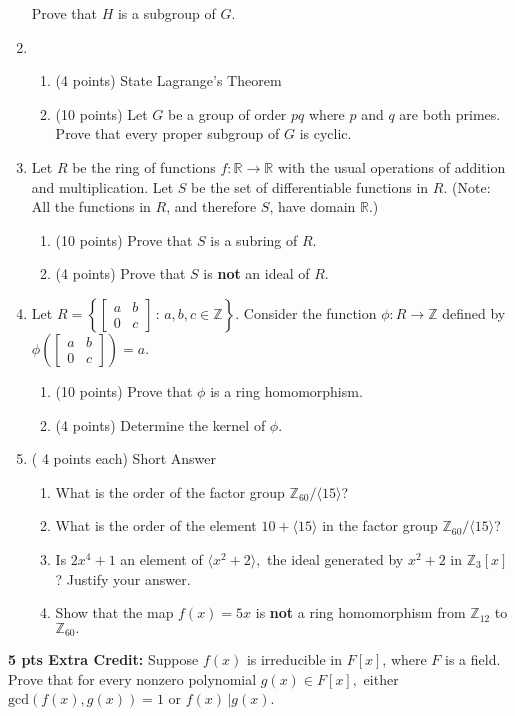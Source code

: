 \documentclass[12pt]{article}
\renewcommand{\emph}[1]{\textsf{\textbf{#1}}}
\newcommand{\bbZ}{\mathbb{Z}}
\newcommand{\bbR}{\mathbb{R}}
\begin{document}
\begin{enumerate}
Prove that $H$ is a subgroup of $G.$\\
\newpage
\item 
	\begin{enumerate}
	\item ({\small 4 points}) State Lagrange's Theorem
	\vspace{2in}
	\item  ({\small 10 points}) Let $G$ be a group of order $pq$ where $p$ and $q$ are both primes. Prove that every proper subgroup of $G$ is cyclic.
	\vfill
	\end{enumerate}
\newpage
\item Let $R$ be the ring of functions $f: \bbR \to \bbR$ with the usual operations of addition and multiplication. Let $S$ be the set of differentiable functions in $R.$ (Note: All the functions in $R$, and therefore $S$, have domain $\bbR.$)
	\begin{enumerate}
	\item ({\small 10 points}) Prove that $S$ is a subring of $R.$
	\vfill
	\item ({\small 4 points}) Prove that $S$ is \emph{not} an ideal of $R.$
	\vfill
	\end{enumerate}
\newpage
\item Let $R=\left\{\begin{bmatrix} a&b\\0&c \end{bmatrix} \, : \, a,b,c \in \bbZ \right\}.$ Consider the function $\phi: R \to \bbZ$ defined by $\phi \left( \begin{bmatrix} a&b\\0&c \end{bmatrix} \right)=a.$
	\begin{enumerate}
	\item ({\small 10 points}) Prove that $\phi$ is a ring homomorphism.
	\vfill
	\item ({\small 4 points}) Determine the kernel of $\phi.$
	\vfill
	\end{enumerate}
\newpage
\item ({\small{ 4 points each}}) Short Answer
	\begin{enumerate}
	\item What is the order of the factor group $\bbZ_{60}/\langle 15 \rangle$?
	\vfill
	\item What is the order of the element $10+\langle 15 \rangle$ in the factor group $\bbZ_{60}/\langle 15 \rangle$?
	\vfill
	\item Is $2x^4+1$ an element of  $\langle x^2+2 \rangle,$  the ideal generated by $x^2+2$ in $\bbZ_3[x]$? Justify your answer.
	\vfill
	\item Show that the map $f(x)=5x$ is \emph{not} a ring homomorphism from $\bbZ_{12}$ to $\bbZ_{60}.$
	\vfill
	\end{enumerate}
\end{enumerate}

\textbf{5 pts Extra Credit:} Suppose $f(x)$ is irreducible in $F[x]$, where $F$ is a field. Prove that for every nonzero polynomial $g(x) \in F[x],$ either $\text{gcd}(f(x),g(x))=1$ or $f(x) \, \big\vert g(x).$\\

\vspace{3in}
\end{document}
